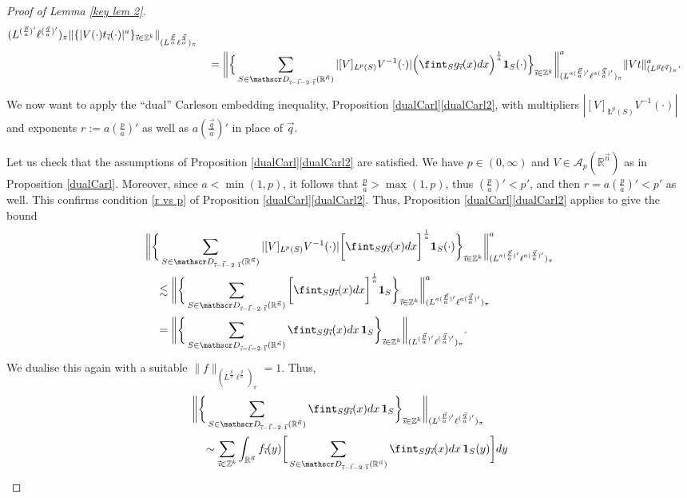 \documentclass[11pt, reqno]{amsart}
\theoremstyle{definition}
\theoremstyle{remark}
\numberwithin{equation}{section}
\newcommand{\A}{\mathscr A}
\newcommand{\D}{\mathscr D}
\newcommand{\R}{\mathbb R}
\newcommand{\Z}{\mathbb Z}
\newcommand{\vone}{\vec 1}
\newcommand{\vi}{\vec{\textit{\i}}}
\newcommand{\vn}{\vec n}
\newcommand{\vl}{\vec l}
\newcommand{\vp}{\vec p}
\newcommand{\vq}{\vec q}
\newcommand{\one}{\mathbf{1}}
\newcommand{\aveL}{\textit{\L}}
\newcommand{\abs}[1]{|#1|}
\newcommand{\Norm}[2]{\|#1\|_{#2}}
\newcommand{\bbNorm}[2]{\bigg\|#1\bigg\|_{#2}}
\begin{document}
\begin{proof}[Proof of Lemma \ref{key lem 2}]
\begin{align*}
{(L^{(\frac{\vp}{a})'}\ell^{(\frac{\vq}{a})'})_\pi}
\Norm{\{\abs{V(\cdot)t_{\vi}(\cdot)}^a\}_{\vi\in\Z^k}}{(L^{\frac{\vp}{a}}\ell^{\frac{\vq}{a}})_\pi} \\
&\quad=\bbNorm{\Big\{
\sum_{S\in\D_{\vi-\vl-2\cdot\vone}(\R^{\vn})} \abs{[V]_{\aveL^p(S)}V^{-1}(\cdot)}\Big(\fint_S g_{\vi}(x)dx\Big)^{\frac1a} \one_S(\cdot)\Big\}_{\vi\in\Z^k}}{
(L^{a(\frac{\vp}{a})'}\ell^{a(\frac{\vq}{a})'})_\pi}^{a}
\Norm{Vt}{(L^{\vp}\ell^{\vq})_\pi}^a.
\end{align*}
We now want to apply the ``dual'' Carleson embedding inequality, Proposition \ref{dualCarl}\eqref{dualCarl2}, with multipliers $\abs{[V]_{\aveL^p(S)}V^{-1}(\cdot)}$ and exponents $r:=a(\frac{p}{a})'$ as well as $a(\frac{\vq}{a})'$ in place of $\vq$.

Let us check that the assumptions of Proposition \ref{dualCarl}\eqref{dualCarl2} are satisfied. We have $p\in(0,\infty)$ and $V\in\A_p(\R^{\vn})$ as in Proposition \ref{dualCarl}. Moreover, since $a<\min(1,p)$, it follows that $\frac{p}{a}>\max(1,p)$, thus $(\frac{p}{a})'<p'$, and then $r=a(\frac{p}{a})'<p'$ as well.
This confirms condition \eqref{r vs p} of Proposition \ref{dualCarl}\eqref{dualCarl2}.
Thus, Proposition \ref{dualCarl}\eqref{dualCarl2} applies to give the bound
\begin{align*}
&\bbNorm{\bigg\{
\sum_{S\in\D_{\vi-\vl-2\cdot\vone}(\R^{\vn})} \abs{[V]_{\aveL^p(S)}V^{-1}(\cdot)}\bigg[\fint_S g_{\vi}(x)dx\bigg]^{\frac1a} \one_S(\cdot) \bigg\}_{\vi\in\Z^k}}{
(L^{a(\frac{\vp}{a})'}\ell^{a(\frac{\vq}{a})'})_\pi}^a \\
&\quad\lesssim\bbNorm{\bigg\{
\sum_{S\in\D_{\vi-\vl-2\cdot\vone}(\R^{\vn})} \bigg[\fint_S g_{\vi}(x)dx\bigg]^{\frac1a} \one_S\bigg\}_{\vi\in\Z^k}}{
(L^{a(\frac{\vp}{a})'}\ell^{a(\frac{\vq}{a})'})_\pi}^a \\
&\quad=\bbNorm{\bigg\{
\sum_{S\in\D_{\vi-\vl-2\cdot\vone}(\R^{\vn})} \fint_S g_{\vi}(x)dx\, \one_S\bigg\}_{\vi\in\Z^k}}{
(L^{(\frac{\vp}{a})'}\ell^{(\frac{\vq}{a})'})_\pi}.
\end{align*}
We dualise this again with a suitable $\Norm{f}{(L^{\frac{\vp}{a}}\ell^{\frac{\vq}{a}})_\pi}=1$. Thus,
\begin{align*}
&\bbNorm{\bigg\{
\sum_{S\in\D_{\vi-\vl-2\cdot\vone}(\R^{\vn})} \fint_S g_{\vi}(x)dx\, \one_S\bigg\}_{\vi\in\Z^k}}{
(L^{(\frac{\vp}{a})'}\ell^{(\frac{\vq}{a})'})_\pi} \\
&\quad\sim\sum_{\vi\in\Z^k}\int_{\R^{\vn}}f_{\vi}(y)\bigg[\sum_{S\in\D_{\vi-\vl-2\cdot\vone}(\R^{\vn})} \fint_S g_{\vi}(x)dx\, \one_S(y)\bigg]dy \\

\end{align*}
\end{proof}
\end{document}
